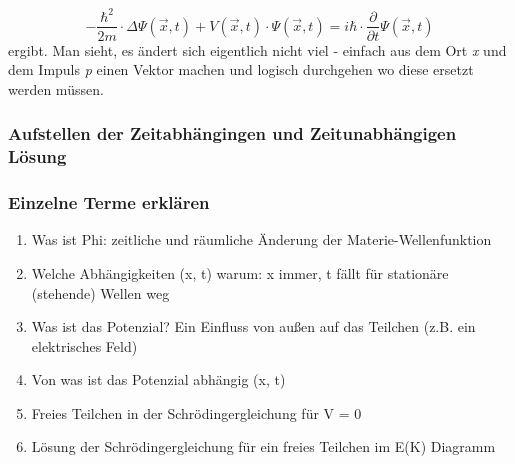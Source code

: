 \begin{equation}
    -\frac{\hbar^2}{2m} \cdot \Delta \Psi(\vec{x},t) + V(\vec{x},t) \cdot \Psi(\vec{x},t) = i \hbar \cdot \frac{\partial}{\partial t} \Psi(\vec{x},t)
\end{equation}
ergibt. Man sieht, es ändert sich eigentlich nicht viel - einfach aus dem Ort \textit{x} und dem Impuls \textit{p} einen Vektor machen und logisch durchgehen wo diese ersetzt werden müssen. 

\subsubsection{Aufstellen der Zeitabhängingen und Zeitunabhängigen Lösung}

\subsubsection{Einzelne Terme erklären}
\begin{enumerate}
    \item Was ist Phi: zeitliche und räumliche Änderung der Materie-Wellenfunktion
    \item Welche Abhängigkeiten (x, t) warum: x immer, t fällt für stationäre (stehende) Wellen weg
    \item Was ist das Potenzial? Ein Einfluss von außen auf das Teilchen (z.B. ein elektrisches Feld)
    \item Von was ist das Potenzial abhängig (x, t)
    \item Freies Teilchen in der Schrödingergleichung für V = 0
    \item Lösung der Schrödingergleichung für ein freies Teilchen im E(K) Diagramm
\end{enumerate}